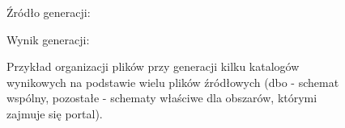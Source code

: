 \begin{figure}[!ht]
Źródło generacji:


Wynik generacji:


\caption{Przykład organizacji plików przy generacji kilku katalogów wynikowych na podstawie wielu plików źródłowych (dbo - schemat wspólny, pozostałe - schematy właściwe dla obszarów, którymi zajmuje się portal).}
\label{fig:implementation_core:multipleSourceFiles}
\end{figure}
